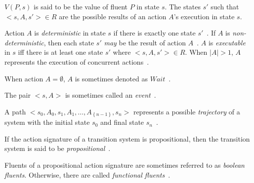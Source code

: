 $ V(P,s) $ is said to be the value of fluent $ P $ in state $ s $.
The states $ s' $ such that $ <s, A, s'> \in R $ are the possible results of an action $ A $'s execution in state $ s $.

\begin{definition}
    \label{def:action_a_determinism}
    Action $ A $ is \textit{deterministic} in state $ s $ if there is exactly one state $ s' $~\citep{gelfond_action_1998}.
    If $ A $ is \textit{non-deterministic}, then each state $ s' $ \textit{may} be the result of action $ A $~\citep{blount_architecture_2013}.
    $ A $ is \textit{executable} in $ s $ iff there is at least one state $ s' $ where $ <s, A, s'> \in R $.
    When $ \left|A\right|>1 $, $A$ represents the execution of concurrent actions~\citep{gelfond_action_1998, blount_architecture_2013}.
\end{definition}

\begin{definition}
    \label{def:wait}
    When action $A = \emptyset$, $A$ is sometimes denoted as $Wait$~\citep{gelfond_action_1998}.
\end{definition}

\begin{definition}
    \label{def:event}
    The pair $<s, A>$ is sometimes called an \textit{event}~\citep{gelfond_authorization_2008}.
\end{definition}

\begin{definition}
    \label{def:trajectory}
    A path $ <s_0, A_0, s_1, A_1, \dots, A_{\left\{n-1\right\}}, s_n> $ represents a possible \textit{trajectory} of a system with the initial state $ s_0 $ and final state $ s_n $~\citep{blount_architecture_2013}.
\end{definition}

\begin{definition}
    \label{def:propositional_transition_system}
    If the action signature of a transition system is propositional, then the transition system is said to be \textit{propositional}~\citep{gelfond_action_1998}.
\end{definition}

\begin{definition}
    Fluents of a propositional action signature are sometimes referred to as \textit{boolean fluents}.
    Otherwise, there are called \textit{functional fluents}~\citep{chintabathina_modeling_2004}.
\end{definition}

